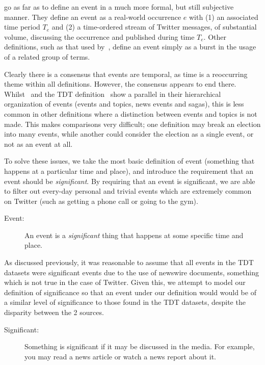 \cite{Becker_beyondtrending} go as far as to define an event in a much more formal, but still subjective manner.
They define an event as a real-world occurrence \(e\) with (1) an associated time period \(T_e\) and (2) a time-ordered stream of Twitter messages, of substantial volume, discussing the occurrence and published during time \(T_e\).
Other definitions, such as that used by~\cite{weng2011event}, define an event simply as a burst in the usage of a related group of terms.

Clearly there is a consensus that events are temporal, as time is a reoccurring theme within all definitions.
However, the consensus appears to end there.
Whilst~\cite{aggarwalevent} and the TDT definition~\citep{Allan:2002:ITD:772260.772262} show a parallel in their hierarchical organization of events (events and topics, news events and sagas), this is less common in other definitions where a distinction between events and topics is not made.
This makes comparisons very difficult; one definition may break an election into many events, while another could consider the election as a single event, or not as an event at all.

To solve these issues, we take the most basic definition of event (something that happens at a particular time and place), and introduce the requirement that an event should be \textit{significant}.
By requiring that an event is significant, we are able to filter out every-day personal and trivial events which are extremely common on Twitter (such as getting a phone call or going to the gym).

\begin{description}
\item[Event:] An event is a \emph{significant} thing that happens at some specific time and place.
\end{description}

As discussed previously, it was reasonable to assume that all events in the TDT datasets were significant events due to the use of newswire documents, something which is not true in the case of Twitter.
Given this, we attempt to model our definition of significance so that an event under our definition would would be of a similar level of significance to those found in the TDT datasets, despite the disparity between the 2 sources.

\begin{description}
\item[Significant:] Something is significant if it may be discussed in the media. For example, you may read a news article or watch a news report about it.
\end{description}

